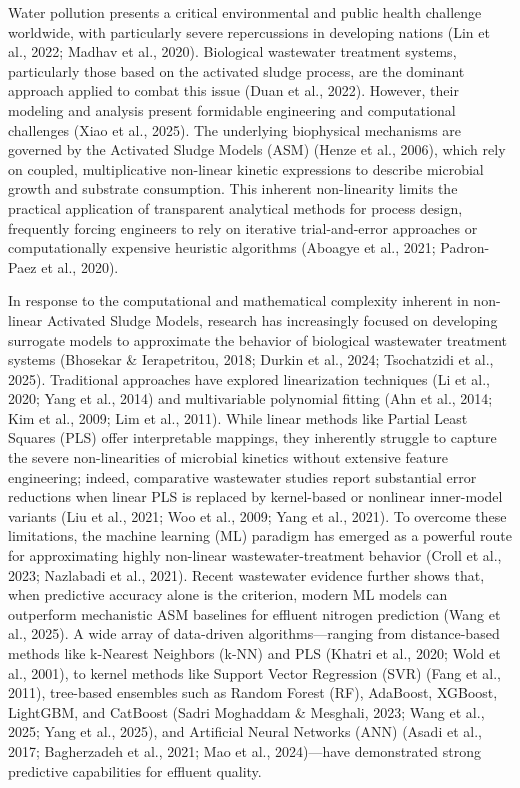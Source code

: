 \documentclass[a4paper,fleqn]{cas-sc}
\begin{document}
Water pollution presents a critical environmental and public health challenge worldwide, with particularly severe repercussions in developing nations (Lin et al., 2022; Madhav et al., 2020). Biological wastewater treatment systems, particularly those based on the activated sludge process, are the dominant approach applied to combat this issue (Duan et al., 2022). However, their modeling and analysis present formidable engineering and computational challenges (Xiao et al., 2025). The underlying biophysical mechanisms are governed by the Activated Sludge Models (ASM) (Henze et al., 2006), which rely on coupled, multiplicative non-linear kinetic expressions to describe microbial growth and substrate consumption. This inherent non-linearity limits the practical application of transparent analytical methods for process design, frequently forcing engineers to rely on iterative trial-and-error approaches or computationally expensive heuristic algorithms (Aboagye et al., 2021; Padron-Paez et al., 2020).

In response to the computational and mathematical complexity inherent in non-linear Activated Sludge Models, research has increasingly focused on developing surrogate models to approximate the behavior of biological wastewater treatment systems (Bhosekar \& Ierapetritou, 2018; Durkin et al., 2024; Tsochatzidi et al., 2025). Traditional approaches have explored linearization techniques (Li et al., 2020; Yang et al., 2014) and multivariable polynomial fitting (Ahn et al., 2014; Kim et al., 2009; Lim et al., 2011). While linear methods like Partial Least Squares (PLS) offer interpretable mappings, they inherently struggle to capture the severe non-linearities of microbial kinetics without extensive feature engineering; indeed, comparative wastewater studies report substantial error reductions when linear PLS is replaced by kernel-based or nonlinear inner-model variants (Liu et al., 2021; Woo et al., 2009; Yang et al., 2021). To overcome these limitations, the machine learning (ML) paradigm has emerged as a powerful route for approximating highly non-linear wastewater-treatment behavior (Croll et al., 2023; Nazlabadi et al., 2021). Recent wastewater evidence further shows that, when predictive accuracy alone is the criterion, modern ML models can outperform mechanistic ASM baselines for effluent nitrogen prediction (Wang et al., 2025). A wide array of data-driven algorithms---ranging from distance-based methods like k-Nearest Neighbors (k-NN) and PLS (Khatri et al., 2020; Wold et al., 2001), to kernel methods like Support Vector Regression (SVR) (Fang et al., 2011), tree-based ensembles such as Random Forest (RF), AdaBoost, XGBoost, LightGBM, and CatBoost (Sadri Moghaddam \& Mesghali, 2023; Wang et al., 2025; Yang et al., 2025), and Artificial Neural Networks (ANN) (Asadi et al., 2017; Bagherzadeh et al., 2021; Mao et al., 2024)---have demonstrated strong predictive capabilities for effluent quality. 
\end{document}
